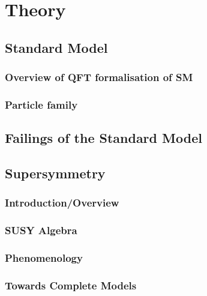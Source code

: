 
\chapter{Theory}

\ifpdf
    \graphicspath{{Chapter2/Figs/Raster/}{Chapter2/Figs/PDF/}{Chapter2/Figs/}}
\else
    \graphicspath{{Chapter2/Figs/Vector/}{Chapter2/Figs/}}
\fi


\section{Standard Model}  %
\label{sec:theory_standard_model_intro}

\subsection{Overview of QFT formalisation of SM}

\subsection{Particle family}


\section{Failings of the Standard Model}  %
\label{sec:theory_standard_model_failings}


\section{Supersymmetry}  %
\label{sec:theory_supersymmetry}

\subsection{Introduction/Overview}

\subsection{SUSY Algebra}

\subsection{Phenomenology}

\subsection{Towards Complete Models}

